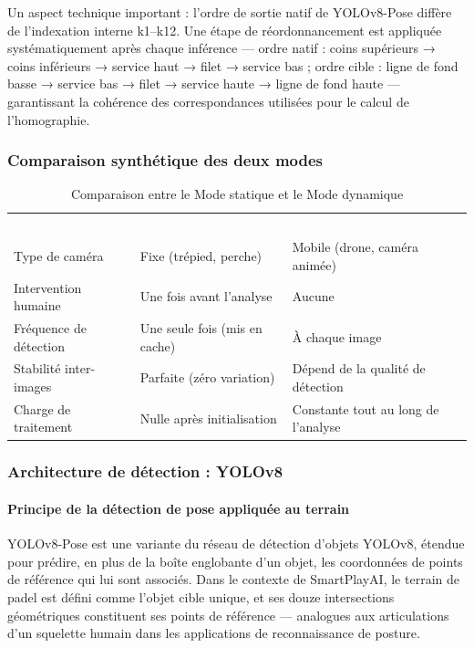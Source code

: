 Un aspect technique important : l'ordre de sortie natif de YOLOv8-Pose diffère de l'indexation interne k1–k12. Une étape de réordonnancement est appliquée systématiquement après chaque inférence — ordre natif : coins supérieurs → coins inférieurs → service haut → filet → service bas ; ordre cible : ligne de fond basse → service bas → filet → service haute → ligne de fond haute — garantissant la cohérence des correspondances utilisées pour le calcul de l'homographie.
\subsubsection{Comparaison synthétique des deux modes}
\begin{table}[H]
  \centering
  \renewcommand{\arraystretch}{1.3}
  \begin{tabularx}{\textwidth}{L{4cm} X X}
    \textcolor{white}{\textbf{Critère}} &
    \textcolor{white}{\textbf{Mode statique}} &
    \textcolor{white}{\textbf{Mode dynamique}} \\
    Type de caméra & Fixe (trépied, perche) & Mobile (drone, caméra animée) \\
    Intervention humaine & Une fois avant l'analyse & Aucune \\
    Fréquence de détection & Une seule fois (mis en cache) & À chaque image \\
    Stabilité inter-images & Parfaite (zéro variation) & Dépend de la qualité de détection \\
    Charge de traitement & Nulle après initialisation & Constante tout au long de l'analyse \\
  \end{tabularx}
  \caption{Comparaison entre le Mode statique et le Mode dynamique}
  \label{tab:comparaison_modes}
\end{table}
\subsubsection{Architecture de détection : YOLOv8}

\paragraph{Principe de la détection de pose appliquée au terrain}

YOLOv8-Pose est une variante du réseau de détection d'objets YOLOv8, étendue pour prédire, en plus de la boîte englobante d'un objet, les coordonnées de points de référence qui lui sont associés. Dans le contexte de SmartPlayAI, le terrain de padel est défini comme l'objet cible unique, et ses douze intersections géométriques constituent ses points de référence — analogues aux articulations d'un squelette humain dans les applications de reconnaissance de posture.

